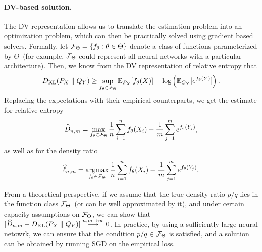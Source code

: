 \documentclass[12pt]{article}
\begin{document}
\paragraph{DV-based solution.} The DV representation allows us to translate the estimation problem into an optimization problem, which can then be practically solved using gradient based solvers. Formally, let ${\cal F}_\Theta = \{f_\theta: \theta \in \Theta\}$ denote a class of functions parameterized by $\Theta$~(for example, ${\cal F}_\Theta$ could represent all neural networks with a particular architecture). Then, we know from the DV representation of relative entropy that 
\begin{align}
D_{\text{KL}}(P_X \parallel Q_Y) \geq \sup_{f_\theta \in {\cal F}_\Theta} \mathbb{E}_{P_X}[f_\theta(X)] - \log \left( \mathbb{E}_{Q_Y}[e^{f_\theta(Y)}] \right). 
\end{align}
Replacing the expectations with their empirical counterparts, we get the estimate for relative entropy
\begin{align}
	\widehat{D}_{n,m} = \max_{f_\theta \in {\cal F}_\Theta}  \frac{1}{n} \sum_{i=1}^n f_\theta(X_i) - \frac{1}{m} \sum_{j=1}^m e^{f_\theta(Y_j)}, 
\end{align}
as well as for the density ratio 
\begin{align}
\widehat{\ell}_{n,m} = \operatorname*{argmax}_{f_\theta \in {\cal F}_\Theta} \frac{1}{n} \sum_{i=1}^n f_\theta(X_i) - \frac{1}{m} \sum_{j=1}^m e^{f_\theta(Y_j)}. 
\end{align}

From a theoretical perspective, if we assume that the true density ratio $p/q$ lies in the function class ${\cal F}_\Theta$~(or can be well approximated by it), and under certain capacity assumptions on ${\cal F}_\Theta$, we can show that $|\widehat{D}_{n,m} - D_{\text{KL}}(P_X \parallel Q_Y)| \overset{n,m\to \infty}{\longrightarrow} 0$. 
In practice, by using a sufficiently large neural netowrk, we can ensure that the condition $p/q \in {\cal F}_\Theta$ is satisfied, and a solution can be obtained by running SGD on the empirical loss. 
\end{document}
